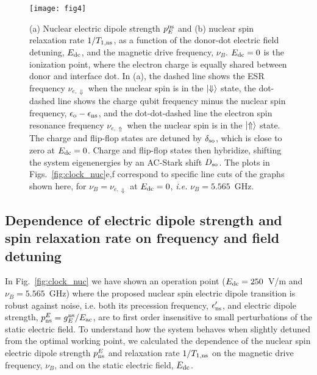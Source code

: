 \documentclass[
 aps,prb,twocolumn,
 amsmath,amssymb,superscriptaddress,
] {revtex4-1}
\begin{document}
\begin{figure*}
	\centering
	\texttt{[image: fig4]}
	\caption{
		(a) Nuclear electric dipole strength $p_E^{\rm ns}$ and
		(b) nuclear spin relaxation rate $1/T_{\rm 1,ns}$, as a function of the donor-dot electric field detuning, $E_{\rm dc}$, and the magnetic drive frequency, $\nu_B$. $E_{\rm dc}=0$ is the ionization point, where the electron charge is equally shared between donor and interface dot. In (a), the dashed line shows the ESR frequency $\nu_{e,\Downarrow}$ when the nuclear spin is in the  $\ket{\Downarrow}$ state, the dot-dashed line shows the charge qubit frequency minus the nuclear spin frequency, $\epsilon_{\rm o} - \epsilon_{\rm ns}$, and the dot-dot-dashed line the electron spin resonance frequency $\nu_{e,\Uparrow}$ when the nuclear spin is in the $\ket{\Uparrow}$ state. The charge and flip-flop states are detuned by $\delta_{\rm so}$, which is close to zero at $E_{\rm dc}=0$. Charge and flip-flop states then hybridize, shifting the system eigenenergies by an AC-Stark shift $D_{\rm so}$. The plots in Figs.~\ref{fig:clock_nuc}e,f correspond to specific line cuts of the graphs shown here, for $\nu_B=\nu_{e,\Downarrow}$ at $E_{\rm dc}=0$, \textit{i.e.} $\nu_B=5.565$~GHz.
	}
	\label{fig:fig4}
\end{figure*}


\subsection{Dependence of electric dipole strength and spin relaxation rate on frequency and field detuning} \label{supp:detdep}

In Fig.~\ref{fig:clock_nuc} we have shown an operation point ($E_{\rm dc}=250$~V/m and $\nu_B=5.565$~GHz) where the proposed nuclear spin electric dipole transition is robust against noise, i.e. both its precession frequency, $\epsilon_{\rm ns}'$, and electric dipole strength, $p^E_{\rm ns}=g_E^{\rm ns}/E_{\rm ac}$, are to first order insensitive to small perturbations of the static electric field. To understand how the system behaves when slightly detuned from the optimal working point, we calculated the dependence of the nuclear spin electric dipole strength $p^E_{\rm ns}$ and relaxation rate $1/T_{1, \rm ns}$ on the magnetic drive frequency, $\nu_B$, and on the static electric field, $E_{\rm dc}$. 
\end{document}
